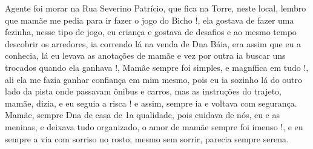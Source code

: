 \documentclass[
  brazil,
  a6paper,
  oneside,
  landscape,
  14pt]{scrbook}
\begin{document}
Agente foi morar na Rua Severino Patrício, que fica na Torre, neste
local, lembro que mamãe me pedia para ir fazer o jogo do Bicho !, ela
gostava de fazer uma fezinha, nesse tipo de jogo, eu criança e gostava
de desafios e ao mesmo tempo descobrir os arredores, ia correndo lá na
venda de Dna Báia, era assim que eu a conhecia, lá eu levava as
anotações de mamãe e vez por outra ia buscar uns trocados quando ela
ganhava !, Mamãe sempre foi simples, e magnífica em tudo !, ali ela me
fazia ganhar confiança em mim mesmo, pois eu ia sozinho lá do outro lado
da pista onde passavam ônibus e carros, mas as instruções do trajeto,
mamãe, dizia, e eu seguia a risca ! e assim, sempre ia e voltava com
segurança. Mamãe, sempre Dna de casa de 1a qualidade, pois cuidava de
nós, eu e as meninas, e deixava tudo organizado, o amor de mamãe sempre
foi imenso !, e eu sempre a via com sorriso no rosto, mesmo sem sorrir,
parecia sempre serena.
\end{document}
